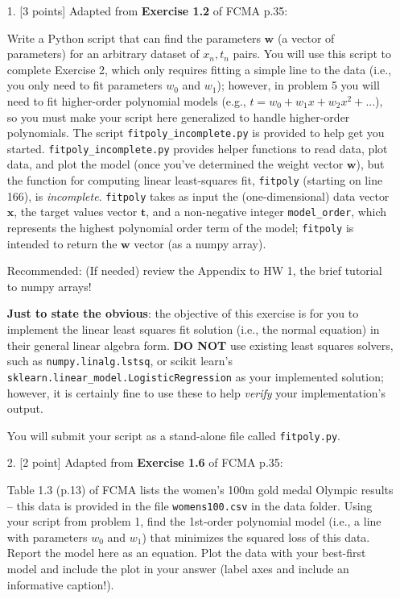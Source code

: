 \documentclass[10pt]{article}
\begin{document}
\newpage
\begin{itemize}



\item[1.] [3 points]
Adapted from {\bf Exercise 1.2} of FCMA p.35:

Write a Python script that can find the parameters $\mathbf{w}$ (a vector of parameters) for an arbitrary dataset of $x_n, t_n$ pairs.  You will use this script to complete Exercise 2, which only requires fitting a simple line to the data (i.e., you only need to fit parameters $w_0$ and $w_1$); however, in problem 5 you will need to fit higher-order polynomial models (e.g., $t = w_0 + w_1x + w_2x^2 + ...$), so you must make your script here generalized to handle higher-order polynomials.  The script {\tt fitpoly\_incomplete.py} is provided to help get you started.  {\tt fitpoly\_incomplete.py} provides helper functions to read data, plot data, and plot the model (once you've determined the weight vector $\mathbf{w}$), but the function for computing linear least-squares fit, {\tt fitpoly} (starting on line 166), is {\em incomplete}.  {\tt fitpoly} takes as input the (one-dimensional) data vector $\mathbf{x}$, the target values vector $\mathbf{t}$, and a non-negative integer {\tt model\_order}, which represents the highest polynomial order term of the model; {\tt fitpoly} is intended to return the $\mathbf{w}$ vector (as a numpy array).

Recommended: (If needed) review the Appendix to HW 1, the brief tutorial to numpy arrays!

{\bf Just to state the obvious}: the objective of this exercise is for you to implement the linear least squares fit solution (i.e., the normal equation) in their general linear algebra form.  {\bf DO NOT} use existing least squares solvers, such as {\tt numpy.linalg.lstsq}, or scikit learn's \\{\tt sklearn.linear\_model.LogisticRegression} as your implemented solution; however, it is certainly fine to use these to help {\em verify} your implementation's output.

You will submit your script as a stand-alone file called {\tt fitpoly.py}.



\item[2.] [2 point]
Adapted from {\bf Exercise 1.6} of FCMA p.35:

Table 1.3 (p.13) of FCMA lists the women's 100m gold medal Olympic results -- this data is provided in the file {\tt womens100.csv} in the data folder.  Using your script from problem 1, find the 1st-order polynomial model (i.e., a line with parameters $w_0$ and $w_1$) that minimizes the squared loss of this data.  Report the model here as an equation.  Plot the data with your best-first model and include the plot in your answer (label axes and include an informative caption!).


\end{itemize}
\end{document}
